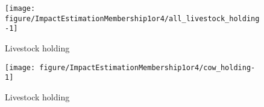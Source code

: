 \begin{Schunk}
\begin{figure}

{\centering \texttt{[image: figure/ImpactEstimationMembership1or4/all\_livestock\_holding-1]} 

}

\caption[Livestock holding\\ {\footnotesize \setlength{\baselineskip}{8pt}}]{Livestock holding\\ {\footnotesize \setlength{\baselineskip}{8pt}}}\label{Figure all livestock holding}
\end{figure}
\end{Schunk}
\begin{Schunk}
\begin{figure}

{\centering \texttt{[image: figure/ImpactEstimationMembership1or4/cow\_holding-1]} 

}

\caption[Livestock holding\\ {\footnotesize \setlength{\baselineskip}{8pt}}]{Livestock holding\\ {\footnotesize \setlength{\baselineskip}{8pt}}}\label{Figure cow holding}
\end{figure}
\end{Schunk}

